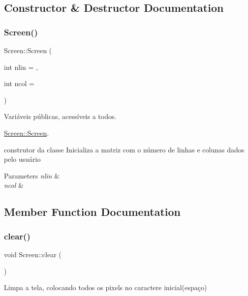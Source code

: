\subsection{Constructor \& Destructor Documentation}
\mbox{\label{classScreen_ac5aad1a42b786eae7163115101f105d2}} 
\subsubsection{\texorpdfstring{Screen()}{Screen()}}
{\footnotesize\ttfamily Screen\+::\+Screen (\begin{DoxyParamCaption}\item[{int}]{nlin = {},  }\item[{int}]{ncol = {} }\end{DoxyParamCaption})}



Variáveis públicas, acessíveis a todos. 

\hyperlink{classScreen_ac5aad1a42b786eae7163115101f105d2}{Screen\+::\+Screen}.

construtor da classe Inicializa a matriz com o número de linhas e colunas dados pelo usuário


\begin{DoxyParams}{Parameters}
{\em nlin} & \\
\hline
{\em ncol} & \\
\hline
\end{DoxyParams}


\subsection{Member Function Documentation}
\mbox{\label{classScreen_a35e74266b2a04e37b354ceff7a5f1031}} 
\subsubsection{\texorpdfstring{clear()}{clear()}}
{\footnotesize\ttfamily void Screen\+::clear (\begin{DoxyParamCaption}{ }\end{DoxyParamCaption})}



Limpa a tela, colocando todos os pixels no caractere inicial(espaço) 

